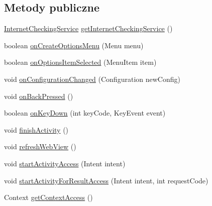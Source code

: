 \subsection*{Metody publiczne}
\begin{DoxyCompactItemize}
\item 
\hyperlink{classpl_1_1edu_1_1uwb_1_1mobiuwb_1_1connection_1_1_internet_checking_service}{Internet\+Checking\+Service} \hyperlink{classpl_1_1edu_1_1uwb_1_1mobiuwb_1_1view_1_1mainactivity_1_1_main_activity_adef4fa893378ec81c75100e0438314b0}{get\+Internet\+Checking\+Service} ()
\item 
boolean \hyperlink{classpl_1_1edu_1_1uwb_1_1mobiuwb_1_1view_1_1mainactivity_1_1_main_activity_a2562cf70eb8cebc0e9de55e38075e636}{on\+Create\+Options\+Menu} (Menu menu)
\item 
boolean \hyperlink{classpl_1_1edu_1_1uwb_1_1mobiuwb_1_1view_1_1mainactivity_1_1_main_activity_a35b5345e5ba8852442c2d1ab593e0add}{on\+Options\+Item\+Selected} (Menu\+Item item)
\item 
void \hyperlink{classpl_1_1edu_1_1uwb_1_1mobiuwb_1_1view_1_1mainactivity_1_1_main_activity_a3910ab6940b22cf55b1a924b6c9e819b}{on\+Configuration\+Changed} (Configuration new\+Config)
\item 
void \hyperlink{classpl_1_1edu_1_1uwb_1_1mobiuwb_1_1view_1_1mainactivity_1_1_main_activity_a45b6a08f971b63779387388b018f9f41}{on\+Back\+Pressed} ()
\item 
boolean \hyperlink{classpl_1_1edu_1_1uwb_1_1mobiuwb_1_1view_1_1mainactivity_1_1_main_activity_a361f460f8fe50d7af14a650fe93fc3c6}{on\+Key\+Down} (int key\+Code, Key\+Event event)
\item 
void \hyperlink{classpl_1_1edu_1_1uwb_1_1mobiuwb_1_1view_1_1mainactivity_1_1_main_activity_ac41486892cd361f50126d7711b49c243}{finish\+Activity} ()
\item 
void \hyperlink{classpl_1_1edu_1_1uwb_1_1mobiuwb_1_1view_1_1mainactivity_1_1_main_activity_ad0f3c0eb605a990a94e8f6c29175edd5}{refresh\+Web\+View} ()
\item 
void \hyperlink{classpl_1_1edu_1_1uwb_1_1mobiuwb_1_1view_1_1mainactivity_1_1_main_activity_a8ea5c4b9468055933e533c0962e7f431}{start\+Activity\+Access} (Intent intent)
\item 
void \hyperlink{classpl_1_1edu_1_1uwb_1_1mobiuwb_1_1view_1_1mainactivity_1_1_main_activity_afee4f8823412ab040c537595564dd0be}{start\+Activity\+For\+Result\+Access} (Intent intent, int request\+Code)
\item 
Context \hyperlink{classpl_1_1edu_1_1uwb_1_1mobiuwb_1_1view_1_1mainactivity_1_1_main_activity_a8b4147dd4e993b91db45c7d6b80728f1}{get\+Context\+Access} ()
\end{DoxyCompactItemize}
